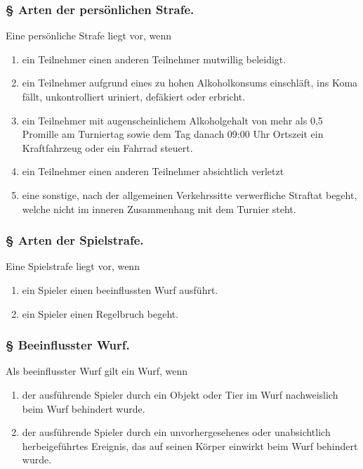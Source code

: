 \documentclass[a5paper, 12pt]{article}
\newcounter{arti}
\newcounter{absatz}
\newcounter{upper}
\newenvironment{para}[1]{%
    \subsubsection{§ \arabic{arti} {#1}.}
    \addtocounter{arti}{1}
    \newcommand{\up}{\textsuperscript{\arabic{upper}}\addtocounter{upper}{1}}
    \newcommand{\abs}{(\arabic{absatz})\addtocounter{absatz}{1}\setcounter{upper}{1}}
}{\setcounter{upper}{1}\setcounter{absatz}{1}}
\begin{document}
\begin{para}{Arten der persönlichen Strafe}
Eine persönliche Strafe liegt vor, wenn
\begin{enumerate}
\item ein Teilnehmer einen anderen Teilnehmer mutwillig beleidigt.
\item ein Teilnehmer aufgrund eines zu hohen Alkoholkonsums einschläft, ins Koma fällt, unkontrolliert uriniert, defäkiert oder erbricht.
\item ein Teilnehmer mit augenscheinlichem Alkoholgehalt von mehr als 0,5 Promille am Turniertag sowie dem Tag danach 09:00 Uhr Ortszeit ein Kraftfahrzeug oder ein Fahrrad steuert.
\item ein Teilnehmer einen anderen Teilnehmer absichtlich verletzt
\item eine sonstige, nach der allgemeinen Verkehrssitte verwerfliche Straftat begeht, welche nicht im inneren Zusammenhang mit dem Turnier steht.
\end{enumerate}
\end{para}

\begin{para}{Arten der Spielstrafe}
Eine Spielstrafe liegt vor, wenn
\begin{enumerate}
\item ein Spieler einen beeinflussten Wurf ausführt.
\item ein Spieler einen Regelbruch begeht.
\end{enumerate}
\end{para}

\begin{para}{Beeinflusster Wurf}
Als beeinflusster Wurf gilt ein Wurf, wenn
\begin{enumerate}
\item der ausführende Spieler durch ein Objekt oder Tier im Wurf nachweislich beim Wurf behindert wurde.
\item der ausführende Spieler durch ein unvorhergesehenes oder unabsichtlich herbeigeführtes Ereignis, das auf seinen Körper einwirkt beim Wurf behindert wurde.
\end{enumerate}
\end{para}
\end{document}
